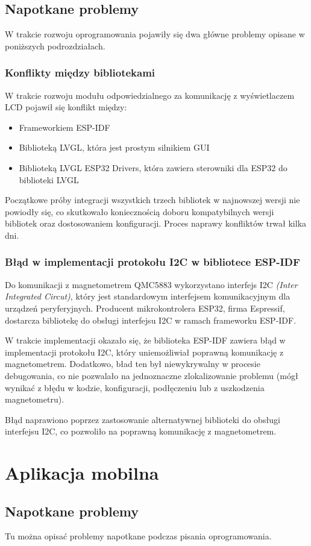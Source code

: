 \subsection{Napotkane problemy}
W trakcie rozwoju oprogramowania pojawiły się dwa główne problemy opisane w poniższych podrozdziałach.
\subsubsection{Konflikty między bibliotekami}
W trakcie rozwoju modułu odpowiedzialnego za komunikację z wyświetlaczem LCD pojawił się konflikt między:
\begin{itemize}
    \item Frameworkiem ESP-IDF
    \item Biblioteką LVGL,\cite{lvgl-esp32-port} która jest prostym silnikiem GUI
    \item Biblioteką LVGL ESP32 Drivers, \cite{lvgl-esp32-drivers} która zawiera sterowniki dla ESP32 do biblioteki LVGL
\end{itemize}
Początkowe próby integracji wszystkich trzech bibliotek w najnowszej wersji nie powiodły się,
co skutkowało koniecznością doboru kompatybilnych wersji bibliotek oraz dostosowaniem konfiguracji.
Proces naprawy konfliktów trwał kilka dni.

\subsubsection{Błąd w implementacji protokołu I2C w bibliotece ESP-IDF}
Do komunikacji z magnetometrem QMC5883 wykorzystano interfejs I2C \textit{(Inter Integrated Circut)}, który jest standardowym interfejsem komunikacyjnym dla urządzeń peryferyjnych.
Producent mikrokontrolera ESP32, firma Espressif, dostarcza bibliotekę do obsługi interfejsu I2C w ramach frameworku ESP-IDF.

W trakcie implementacji okazało się, że biblioteka ESP-IDF zawiera błąd w implementacji protokołu I2C, który uniemożliwiał poprawną komunikację z magnetometrem.
Dodatkowo, bład ten był niewykrywalny w procesie debugowania, co nie pozwalało na jednoznaczne zlokalizowanie problemu (mógł wynikać z błędu w kodzie, konfiguracji, podłęczeniu lub z uszkodzenia magnetometru).

Błąd naprawiono poprzez zastosowanie alternatywnej biblioteki do obsługi interfejsu I2C, co pozwoliło na poprawną komunikację z magnetometrem.

\section{Aplikacja mobilna}
\subsection{Napotkane problemy}
Tu można opisać problemy napotkane podczas pisania oprogramowania.